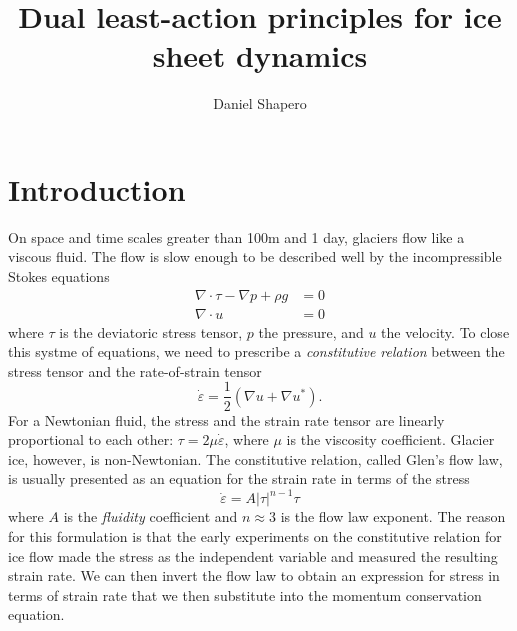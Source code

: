 \documentclass{article}
\title{Dual least-action principles for ice sheet dynamics}
\author{Daniel Shapero}
\date{}
\theoremstyle{definition}
\theoremstyle{plain}
\begin{document}
\maketitle

\section{Introduction}

On space and time scales greater than 100m and 1 day, glaciers flow like a viscous fluid.
The flow is slow enough to be described well by the incompressible Stokes equations
\begin{align}
    \nabla\cdot\tau - \nabla p + \rho g & = 0 \\
    \nabla\cdot u & = 0
\end{align}
where $\tau$ is the deviatoric stress tensor, $p$ the pressure, and $u$ the velocity.
To close this systme of equations, we need to prescribe a \emph{constitutive relation} between the stress tensor and the rate-of-strain tensor
\begin{equation}
    \dot\varepsilon = \frac{1}{2}(\nabla u + \nabla u^*).
\end{equation}
For a Newtonian fluid, the stress and the strain rate tensor are linearly proportional to each other: $\tau = 2\mu\dot\varepsilon$, where $\mu$ is the viscosity coefficient.
Glacier ice, however, is non-Newtonian.
The constitutive relation, called Glen's flow law, is usually presented as an equation for the strain rate in terms of the stress
\begin{equation}
    \dot\varepsilon = A|\tau|^{n - 1}\tau
    \label{eq:glen-flow-law}
\end{equation}
where $A$ is the \emph{fluidity} coefficient and $n \approx 3$ is the flow law exponent.
The reason for this formulation is that the early experiments on the constitutive relation for ice flow made the stress as the independent variable and measured the resulting strain rate.
We can then invert the flow law to obtain an expression for stress in terms of strain rate that we then substitute into the momentum conservation equation.
\end{document}

